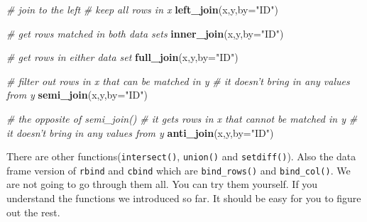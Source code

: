 \documentclass[12pt,]{krantz}
\makeatletter
\newenvironment{Shaded}{\begin{snugshade}}{\end{snugshade}}
\newcommand{\KeywordTok}[1]{\textcolor[rgb]{0.27,0.27,0.27}{\textbf{#1}}}
\newcommand{\DataTypeTok}[1]{\textcolor[rgb]{0.27,0.27,0.27}{#1}}
\newcommand{\StringTok}[1]{\textcolor[rgb]{0.5,0.5,0.5}{#1}}
\newcommand{\CommentTok}[1]{\textcolor[rgb]{0.37,0.37,0.37}{\textit{#1}}}
\newcommand{\NormalTok}[1]{#1}
\newenvironment{kframe}{%
\medskip{}
\setlength{\fboxsep}{.8em}
 \def\at@end@of@kframe{}%
 \ifinner\ifhmode%
  \def\at@end@of@kframe{\end{minipage}}%
  \begin{minipage}{\columnwidth}%
 \fi\fi%
 \def\FrameCommand##1{\hskip\@totalleftmargin \hskip-\fboxsep
 \colorbox{shadecolor}{##1}\hskip-\fboxsep
     \hskip-\linewidth \hskip-\@totalleftmargin \hskip\columnwidth}%
 \MakeFramed {\advance\hsize-\width
   \@totalleftmargin\z@ \linewidth\hsize
   \@setminipage}}%
 {\par\unskip\endMakeFramed%
 \at@end@of@kframe}
\renewenvironment{Shaded}{\begin{kframe}}{\end{kframe}}
\theoremstyle{definition}
\theoremstyle{definition}
\theoremstyle{definition}
\theoremstyle{remark}
\makeatother
\begin{document}
\begin{Shaded}
\begin{Highlighting}[]
\CommentTok{# join to the left}
\CommentTok{# keep all rows in x}
\KeywordTok{left_join}\NormalTok{(x,y,}\DataTypeTok{by=}\StringTok{"ID"}\NormalTok{)}
\end{Highlighting}
\end{Shaded}

\begin{Shaded}
\begin{Highlighting}[]
\CommentTok{# get rows matched in both data sets}
\KeywordTok{inner_join}\NormalTok{(x,y,}\DataTypeTok{by=}\StringTok{"ID"}\NormalTok{)}
\end{Highlighting}
\end{Shaded}

\begin{Shaded}
\begin{Highlighting}[]
\CommentTok{# get rows in either data set}
\KeywordTok{full_join}\NormalTok{(x,y,}\DataTypeTok{by=}\StringTok{"ID"}\NormalTok{)}
\end{Highlighting}
\end{Shaded}

\begin{Shaded}
\begin{Highlighting}[]
\CommentTok{# filter out rows in x that can be matched in y }
\CommentTok{# it doesn't bring in any values from y }
\KeywordTok{semi_join}\NormalTok{(x,y,}\DataTypeTok{by=}\StringTok{"ID"}\NormalTok{)}
\end{Highlighting}
\end{Shaded}

\begin{Shaded}
\begin{Highlighting}[]
\CommentTok{# the opposite of  semi_join()}
\CommentTok{# it gets rows in x that cannot be matched in y}
\CommentTok{# it doesn't bring in any values from y}
\KeywordTok{anti_join}\NormalTok{(x,y,}\DataTypeTok{by=}\StringTok{"ID"}\NormalTok{)}
\end{Highlighting}
\end{Shaded}

There are other functions(\texttt{intersect()}, \texttt{union()} and
\texttt{setdiff()}). Also the data frame version of \texttt{rbind} and
\texttt{cbind} which are \texttt{bind\_rows()} and \texttt{bind\_col()}.
We are not going to go through them all. You can try them yourself. If
you understand the functions we introduced so far. It should be easy for
you to figure out the rest.
\end{document}
